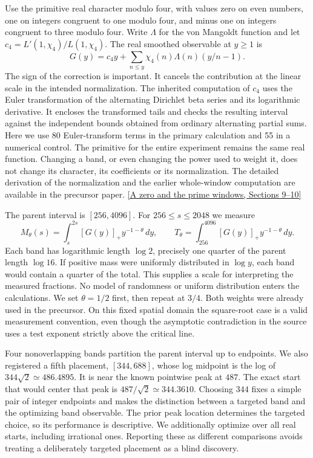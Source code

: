 \documentclass[12pt,letterpaper]{article}
\begin{document}
Use the primitive real character modulo four, with values zero on even numbers, one on integers congruent to one modulo four, and minus one on integers congruent to three modulo four. Write $\Lambda$ for the von Mangoldt function and let $c_4=L'(1,\chi_4)/L(1,\chi_4)$. The real smoothed observable at $y\geq 1$ is
\[
 G(y)=c_4y+\sum_{n\leq y}\chi_4(n)\Lambda(n)(y/n-1).
\]
The sign of the correction is important. It cancels the contribution at the linear scale in the intended normalization. The inherited computation of $c_4$ uses the Euler transformation of the alternating Dirichlet beta series and its logarithmic derivative. It encloses the transformed tails and checks the resulting interval against the independent bounds obtained from ordinary alternating partial sums. Here we use 80 Euler-transform terms in the primary calculation and 55 in a numerical control. The primitive for the entire experiment remains the same real function. Changing a band, or even changing the power used to weight it, does not change its character, its coefficients or its normalization. The detailed derivation of the normalization and the earlier whole-window computation are available in the precursor paper. \href{https://github.com/nousentllc/riemann-hypothesis/blob/b7b5bc6e5e6814f654753fcbd5f45fecf370344c/research/uriel/experiments/zero-and-arithmetic-windows/A_Zero_and_the_Prime_Windows.pdf}{[A zero and the prime windows, Sections 9--10]}

The parent interval is $[256,4096]$. For $256\leq s\leq2048$ we measure
\[
 M_\theta(s)=\int_s^{2s}[G(y)]_+ y^{-1-\theta}\,dy,
 \qquad T_\theta=\int_{256}^{4096}[G(y)]_+y^{-1-\theta}\,dy.
\]
Each band has logarithmic length $\log 2$, precisely one quarter of the parent length $\log 16$. If positive mass were uniformly distributed in $\log y$, each band would contain a quarter of the total. This supplies a scale for interpreting the measured fractions. No model of randomness or uniform distribution enters the calculations. We set $\theta=1/2$ first, then repeat at $3/4$. Both weights were already used in the precursor. On this fixed spatial domain the square-root case is a valid measurement convention, even though the asymptotic contradiction in the source uses a test exponent strictly above the critical line.

Four nonoverlapping bands partition the parent interval up to endpoints. We also registered a fifth placement, $[344,688]$, whose log midpoint is the log of $344\sqrt 2\simeq486.4895$. It is near the known pointwise peak at $487$. The exact start that would center that peak is $487/\sqrt{2}\simeq344.3610$. Choosing $344$ fixes a simple pair of integer endpoints and makes the distinction between a targeted band and the optimizing band observable. The prior peak location determines the targeted choice, so its performance is descriptive. We additionally optimize over all real starts, including irrational ones. Reporting these as different comparisons avoids treating a deliberately targeted placement as a blind discovery.
\end{document}
